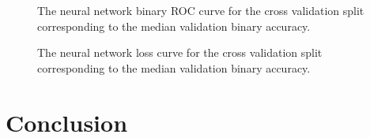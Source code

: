 \documentclass[twocolumn]{article}
\begin{document}
\begin{figure}
\begin{center}
\end{center}
\caption{The neural network binary ROC curve for the cross validation split
  corresponding to the median validation binary accuracy.}
\label{fig:NeuralNetworkROC}
\end{figure}

\begin{figure}
\begin{center}
\end{center}
\caption{The neural network loss curve for the cross validation split
  corresponding to the median validation binary accuracy.}
\label{fig:NeuralNetworkLoss}
\end{figure}

\section{Conclusion}
\label{sec:Conclusion}

\printbibliography
\end{document}
